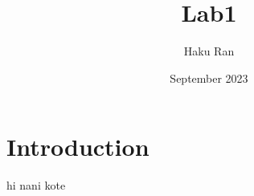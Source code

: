 \documentclass{article}
\title{Lab1}
\author{Haku Ran}
\date{September 2023}
\begin{document}
\maketitle

\section{Introduction}
hi nani kote
\end{document}
